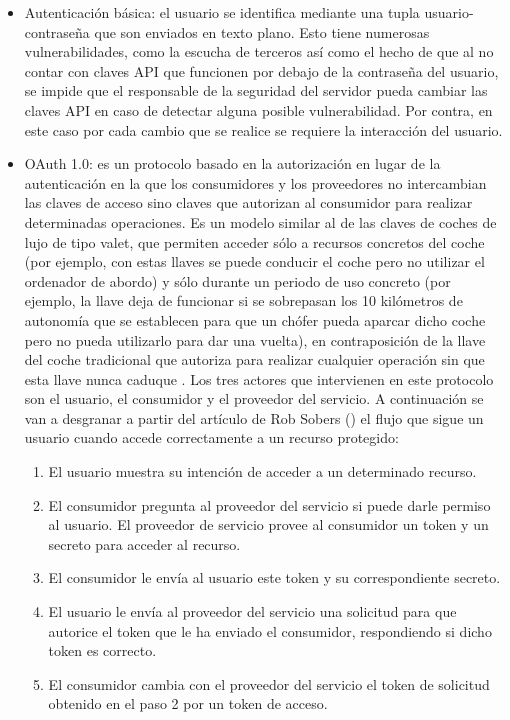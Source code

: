 \begin{itemize}
\item Autenticación básica: el usuario se identifica mediante una tupla usuario-contraseña que son enviados en texto plano. Esto tiene numerosas vulnerabilidades, como la escucha de terceros así como el hecho de que al no contar con claves API que funcionen por debajo de la contraseña del usuario, se impide que el responsable de la seguridad del servidor pueda cambiar las claves API en caso de detectar alguna posible vulnerabilidad. Por contra, en este caso por cada cambio que se realice se requiere la interacción del usuario.

\item OAuth 1.0: es un protocolo basado en la autorización en lugar de la autenticación en la que los consumidores y los proveedores no intercambian las claves de acceso sino claves que autorizan al consumidor para realizar determinadas operaciones. Es un modelo similar al de las claves de coches de lujo de tipo valet, que permiten acceder sólo a recursos concretos del coche (por ejemplo, con estas llaves se puede conducir el coche pero no utilizar el ordenador de abordo) y sólo durante un periodo de uso concreto (por ejemplo, la llave deja de funcionar si se sobrepasan los 10 kilómetros de autonomía que se establecen para que un chófer pueda aparcar dicho coche pero no pueda utilizarlo para dar una vuelta), en contraposición de la llave del coche tradicional que autoriza para realizar cualquier operación sin que esta llave nunca caduque \citep{oauth1}. Los tres actores que intervienen en este protocolo son el usuario, el consumidor y el proveedor del servicio. A continuación se van a desgranar a partir del artículo de Rob Sobers (\citeyear{robsobers}) el flujo que sigue un usuario cuando accede correctamente a un recurso protegido:
\begin{enumerate}
\item El usuario muestra su intención de acceder a un determinado recurso.
\item El consumidor pregunta al proveedor del servicio si puede darle permiso al usuario. El proveedor de servicio provee al consumidor un token y un secreto para acceder al recurso.
\item El consumidor le envía al usuario este token y su correspondiente secreto. 
\item El usuario le envía al proveedor del servicio una solicitud para que autorice el token que le ha enviado el consumidor, respondiendo si dicho token es correcto.
\item El consumidor cambia con el proveedor del servicio el token de solicitud obtenido en el paso 2 por un token de acceso.

\end{enumerate}
\end{itemize}

